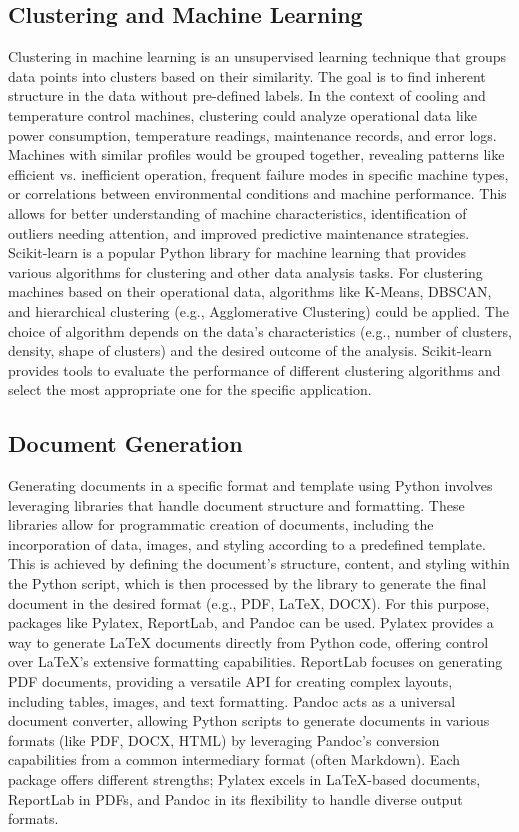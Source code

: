 \documentclass{article}%
\begin{document}
%
\subsection{Clustering and Machine Learning}%
\label{subsec:ClusteringandMachineLearning}%
Clustering in machine learning is an unsupervised learning technique that groups data points into clusters based on their similarity.  The goal is to find inherent structure in the data without pre{-}defined labels.  In the context of cooling and temperature control machines, clustering could analyze operational data like power consumption, temperature readings, maintenance records, and error logs.  Machines with similar profiles would be grouped together, revealing patterns like efficient vs. inefficient operation, frequent failure modes in specific machine types, or correlations between environmental conditions and machine performance. This allows for better understanding of machine characteristics, identification of outliers needing attention, and improved predictive maintenance strategies.\newline%
Scikit{-}learn is a popular Python library for machine learning that provides various algorithms for clustering and other data analysis tasks.  For clustering machines based on their operational data, algorithms like K{-}Means, DBSCAN, and hierarchical clustering (e.g., Agglomerative Clustering) could be applied.  The choice of algorithm depends on the data's characteristics (e.g., number of clusters, density, shape of clusters) and the desired outcome of the analysis.  Scikit{-}learn provides tools to evaluate the performance of different clustering algorithms and select the most appropriate one for the specific application.

%
\subsection{Document Generation}%
\label{subsec:DocumentGeneration}%
Generating documents in a specific format and template using Python involves leveraging libraries that handle document structure and formatting.  These libraries allow for programmatic creation of documents, including the incorporation of data, images, and styling according to a predefined template. This is achieved by defining the document's structure, content, and styling within the Python script, which is then processed by the library to generate the final document in the desired format (e.g., PDF, LaTeX, DOCX). For this purpose, packages like Pylatex, ReportLab, and Pandoc can be used.\newline%
Pylatex provides a way to generate LaTeX documents directly from Python code, offering control over LaTeX's extensive formatting capabilities. ReportLab focuses on generating PDF documents, providing a versatile API for creating complex layouts, including tables, images, and text formatting.  Pandoc acts as a universal document converter, allowing Python scripts to generate documents in various formats (like PDF, DOCX, HTML) by leveraging Pandoc's conversion capabilities from a common intermediary format (often Markdown).  Each package offers different strengths; Pylatex excels in LaTeX{-}based documents, ReportLab in PDFs, and Pandoc in its flexibility to handle diverse output formats.
\end{document}
